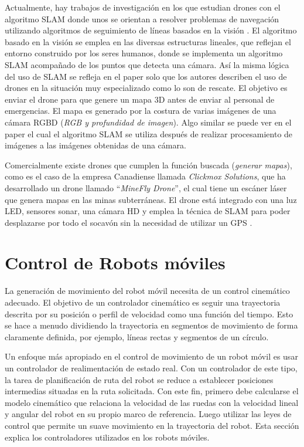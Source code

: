 Actualmente, hay trabajos de investigación en los que estudian drones con el algoritmo SLAM 
donde unos se orientan a resolver problemas de navegación utilizando algoritmos de seguimiento 
de líneas basados en la visión \cite{Verschoor2013}. El algoritmo basado en la visión se 
emplea en las diversas estructuras lineales, que reflejan el entorno construido por los 
seres humanos, donde se implementa un algoritmo SLAM acompañado de los puntos que detecta 
una cámara. Así la misma lógica del uso de SLAM se refleja en el paper \cite{Skoda2015} 
solo que los autores describen el uso de drones en la situación muy especializado como lo 
son de rescate. El objetivo es enviar el drone para que genere un mapa 3D antes de enviar 
al personal de emergencias. El mapa es generado por la costura de varias imágenes de una 
cámara RGBD (\textit{RGB y profundidad de imagen}). Algo similar se puede ver en el 
paper \cite{Heukels2015} el cual el algoritmo SLAM se utiliza después de realizar 
procesamiento de imágenes a las imágenes obtenidas de una cámara.

Comercialmente existe drones que cumplen la función buscada (\textit{generar mapas}), como 
es el caso de la empresa Canadiense llamada \textit{Clickmox Solutions}, que ha 
desarrollado un drone llamado “\textit{MineFly Drone}”, el cual tiene un escáner 
láser que genera mapas en las minas subterráneas. El drone está integrado con una 
luz LED, sensores sonar, una cámara HD y emplea la técnica de SLAM para poder 
desplazarse por todo el socavón sin la necesidad de utilizar un GPS \cite{Solutions2016}. 


\section{Control de Robots m\'oviles}

La generaci\'on de movimiento del robot m\'ovil necesita de un control cinem\'atico 
adecuado. El objetivo de un controlador cinem\'atico es seguir una trayectoria descrita 
por su posici\'on o perfil de velocidad como una funci\'on del tiempo. Esto se hace 
a menudo dividiendo la trayectoria en segmentos de movimiento de forma claramente 
definida, por ejemplo, l\'ineas rectas y segmentos de un c\'irculo.

Un enfoque m\'as apropiado en el control de movimiento de un robot m\'ovil es usar 
un controlador de realimentaci\'on de estado real. Con un controlador de este tipo, 
la tarea de planificaci\'on de ruta del robot se reduce a establecer posiciones 
intermedias situadas en la ruta solicitada. Con este fin, primero debe calcularse 
el modelo cinem\'atico que relaciona la velocidad de las ruedas con la velocidad 
lineal y angular del robot en su propio marco de referencia. Luego utilizar las 
leyes de control que permite un suave movimiento en la trayectoria del robot. Esta 
secci\'on explica los controladores utilizados en los robots m\'oviles.

